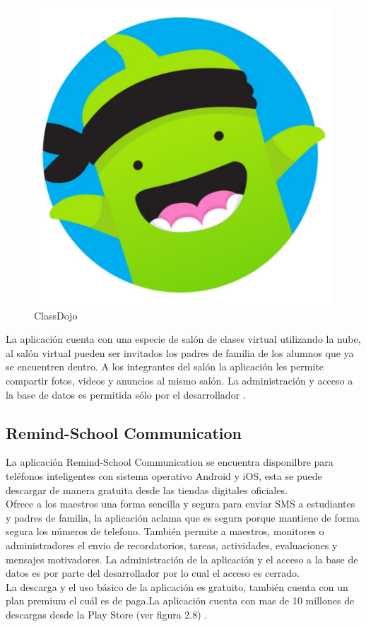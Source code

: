             \begin{figure}[H]
                \centering
                \includegraphics[scale=0.2]{Propuesta_Plantilla_Tesis_LaTeX_UAG/imagenes/classdojo.jpg}
                \caption{ClassDojo}
                \label{fig:classdojo}
            \end{figure}
            
            La aplicación cuenta con una especie de salón de clases virtual utilizando la nube, al salón virtual pueden ser invitados los padres de familia de los alumnos que ya se encuentren dentro. A los integrantes del salón la aplicación les permite compartir fotos, videos y anuncios al mismo salón. La administración y acceso a la base de datos es permitida sólo por el desarrollador \cite{classdojo}. 
    
    
        \subsection{Remind-School Communication}
        
            La aplicación Remind-School Communication se encuentra disponilbre para teléfonos inteligentes con sistema operativo Android y iOS, esta se puede descargar de manera gratuita desde las tiendas digitales oficiales. \\ Ofrece a los maestros una forma sencilla y segura para enviar SMS a estudiantes y padres de familia, la aplicación aclama que es segura porque mantiene de forma segura los números de telefono. También permite a maestros, monitores o administradores el envio de recordatorios, tareas, actividades, evaluaciones y mensajes motivadores. La administración de la aplicación y el acceso a la base de datos es por parte del desarrollador por lo cual el acceso es cerrado. \\ La descarga y el uso básico de la aplicación es gratuito, también cuenta con un plan premium el cuál es de paga.La aplicación cuenta con mas de 10 millones de descargas desde la Play Store (ver figura 2.8) \cite{remind}.
            
